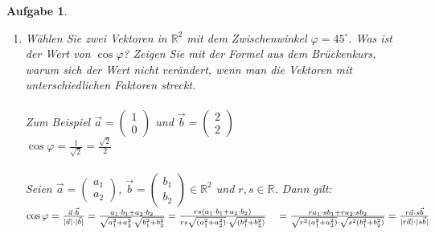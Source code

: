 \documentclass[12pt]{article}
\newtheorem{exercise}[satz]{Aufgabe}
\begin{document}
\begin{exercise}
\begin{enumerate}
\begin{enumerate}
                  $\varphi$ ist gleich dem Winkel zwischen $\vec{a}$ und $\frac{1}{4}\vec{d}$\\
                  $\vec{a}\cdot\frac{1}{4}\vec{d}=-1, \,\vert\vec{a}\vert=\sqrt{10}, \, \vert\frac{1}{4}\vec{d}\vert=\sqrt{5} \\ 
                 \Rightarrow \cos{\varphi}=\frac{-1}{\sqrt{50}}=\frac{-1}{5\sqrt{2}} \Leftrightarrow \varphi = 98,13^\circ$
      \end{enumerate}
    \item[(c)] W\"ahlen Sie zwei Vektoren in $\mathbb{R}^2$ mit dem Zwischenwinkel $\varphi=45^\circ$. Was ist der Wert von $\cos{\varphi}$? Zeigen Sie mit der Formel aus dem Br\"uckenkurs, warum sich der Wert nicht  ver\"andert, wenn man die Vektoren mit unterschiedlichen Faktoren streckt. \\ \\
        Zum Beispiel $\vec{a}=\left(\begin{array}{r} 1 \\ 0 \end{array}\right)$ und
          $\vec{b}=\left(\begin{array}{r} 2 \\ 2 \end{array}\right)$\, \\
          $\cos{\varphi}=\frac{1}{\sqrt{2}}=\frac{\sqrt{2}}{2}$ \\ \\
          Seien $\vec{a}=\left(\begin{array}{r} a_1 \\ a_2 \end{array}\right)$,
          $\vec{b}=\left(\begin{array}{r} b_1 \\ b_2 \end{array}\right) \in \mathbb{R}^2$
          und $r,s \in \mathbb{R}$. Dann gilt:
          $\cos{\varphi}=\frac{\vec{a}\cdot\vec{b}}{\vert\vec{a}\vert \cdot \vert\vec{b}\vert}=
          \frac{a_1\cdot b_1+a_2\cdot b_2}{\sqrt{a_1^2+a_2^2}\cdot\sqrt{b_1^2+b_2^2}}
          = \frac{rs(a_1\cdot b_1+a_2\cdot b_2)}{rs\sqrt{(a_1^2+a_2^2)}\cdot\sqrt{(b_1^2+b_2^2)}}\\
          \quad=\frac{ra_1\cdot sb_1+ra_2\cdot sb_2}{\sqrt{r^2(a_1^2+a_2^2)}\cdot\sqrt{s^2(b_1^2+b_2^2)}}
          =\frac{r\vec{a}\cdot s\vec{b}}{\vert r \vec{a}\vert \cdot \vert s\vec{b}\vert}$
  \end{enumerate}
\end{exercise}
\end{document}
